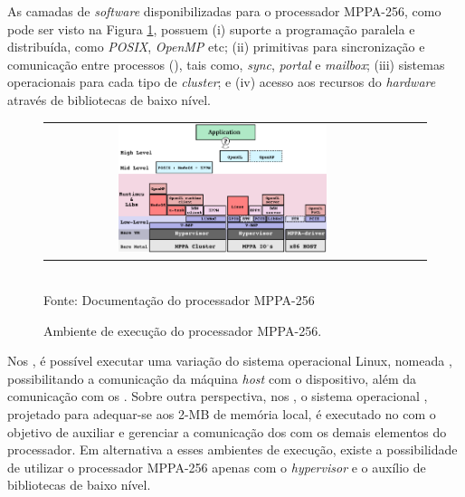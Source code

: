 \documentclass[
  12pt,       %
  openright,      %
  twoside,      %
  a4paper,      %
  english,      %
  brazil,       %
  ]{abntex2}
\begin{document}
        As camadas de \textit{software} disponibilizadas para o processador MPPA-256,
        como pode ser visto na Figura \ref{figruntime}, possuem
        (i) suporte a programação paralela e distribuída, como
        \textit{POSIX}, \textit{OpenMP} etc;
        (ii) primitivas para sincronização e comunicação entre processos
        (\ipc), tais como, \textit{sync}, \textit{portal} e \textit{mailbox};
        (iii) sistemas operacionais para cada tipo de \textit{cluster}; e
        (iv) acesso aos recursos do \textit{hardware} através de bibliotecas de baixo nível.

        \begin{figure}[b]
          \begin{center}
              \caption{Ambiente de execução do processador MPPA-256.}
                   \label{figruntime}
            \begin{tabular}{ccc}
              \includegraphics[width=0.6\textwidth]{figs/software_stack.png} \\
            \end{tabular}
                \vspace{1ex} \\
                Fonte: Documentação do processador MPPA-256
            \end{center}
           \vspace{-2ex}
        \end{figure}

        Nos \ioclusters, é possível executar uma variação do sistema
        operacional Linux, nomeada \rtems, possibilitando a comunicação da
        máquina \textit{host} com o dispositivo, além da comunicação
        com os \cpclusters.
        Sobre outra perspectiva, nos \cpclusters, o sistema operacional
        \nodeos, projetado para adequar-se aos 2-MB de memória local, é executado 
        no \rman com o objetivo de auxiliar e gerenciar a comunicação dos \pes
        com os demais elementos do processador.
        Em alternativa a esses ambientes de execução, existe a possibilidade
        de utilizar o processador MPPA-256 apenas com o \textit{hypervisor} 
        e o auxílio de bibliotecas de baixo nível.
        
\end{document}
